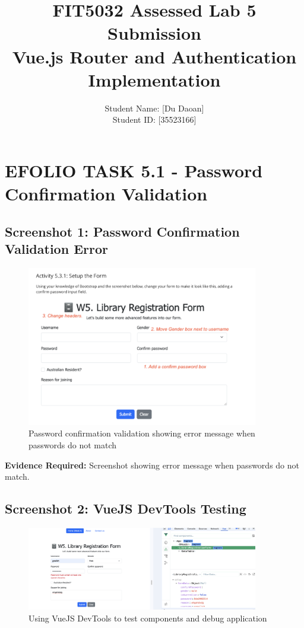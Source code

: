 \documentclass[11pt,a4paper]{article}
\title{\textbf{FIT5032 Assessed Lab 5 Submission\\Vue.js Router and Authentication Implementation}}
\author{Student Name: [Du Daoan]\\Student ID: [35523166]}
\date{}
\begin{document}
\maketitle



\section{EFOLIO TASK 5.1 - Password Confirmation Validation}

\subsection{Screenshot 1: Password Confirmation Validation Error}

 \begin{figure}[h]
     \centering
     \includegraphics[width=0.9\textwidth]{password_validation_error.png}
     \caption{Password confirmation validation showing error message when passwords do not match}
     \label{fig:password_error}
\end{figure}

\textbf{Evidence Required:} Screenshot showing error message when passwords do not match.

\subsection{Screenshot 2: VueJS DevTools Testing}

\begin{figure}[h]
     \centering
     \includegraphics[width=0.9\textwidth]{vue_devtools_testing.png}
     \caption{Using VueJS DevTools to test components and debug application}
     \label{fig:vue_devtools}
\end{figure}
\end{document}
